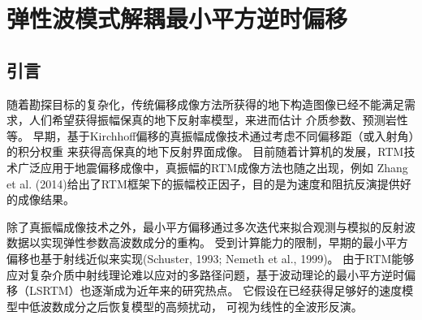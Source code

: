 \chapter{弹性波模式解耦最小平方逆时偏移}
\label{cha:MD-ELSRTM}
\section{引言}
随着勘探目标的复杂化，传统偏移成像方法所获得的地下构造图像已经不能满足需求，人们希望获得振幅保真的地下反射率模型，来进而估计
介质参数、预测岩性等。
早期，基于Kirchhoff偏移的真振幅成像技术通过考虑不同偏移距（或入射角）的积分权重
来获得高保真的地下反射界面成像\cite{BeylkinEtAl1985,Bleistein1987}。
目前随着计算机的发展，RTM技术广泛应用于地震偏移成像中，真振幅的RTM成像方法也随之出现，例如
Zhang et al.
(2014)\cite{Zhang2014}给出了RTM框架下的振幅校正因子，目的是为速度和阻抗反演提供好的成像结果。

除了真振幅成像技术之外，最小平方偏移通过多次迭代来拟合观测与模拟的反射波数据以实现弹性参数高波数成分的重构。
受到计算能力的限制，早期的最小平方偏移也基于射线近似来实现(Schuster, 1993\cite{Schuster1993}; Nemeth
et al., 1999\cite{Nemeth1999})。
由于RTM能够应对复杂介质中射线理论难以应对的多路径问题，基于波动理论的最小平方逆时偏移（LSRTM）也逐渐成为近年来的研究热点。
它假设在已经获得足够好的速度模型中低波数成分之后恢复模型的高频扰动，
可视为线性的全波形反演。


